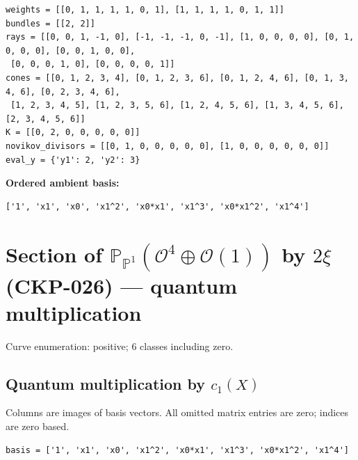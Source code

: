 \documentclass[10pt,a4paper]{article}
\begin{document}
\begin{lstlisting}
weights = [[0, 1, 1, 1, 1, 0, 1], [1, 1, 1, 1, 0, 1, 1]]
bundles = [[2, 2]]
rays = [[0, 0, 1, -1, 0], [-1, -1, -1, 0, -1], [1, 0, 0, 0, 0], [0, 1, 0, 0, 0], [0, 0, 1, 0, 0],
 [0, 0, 0, 1, 0], [0, 0, 0, 0, 1]]
cones = [[0, 1, 2, 3, 4], [0, 1, 2, 3, 6], [0, 1, 2, 4, 6], [0, 1, 3, 4, 6], [0, 2, 3, 4, 6],
 [1, 2, 3, 4, 5], [1, 2, 3, 5, 6], [1, 2, 4, 5, 6], [1, 3, 4, 5, 6], [2, 3, 4, 5, 6]]
K = [[0, 2, 0, 0, 0, 0, 0]]
novikov_divisors = [[0, 1, 0, 0, 0, 0, 0], [1, 0, 0, 0, 0, 0, 0]]
eval_y = {'y1': 2, 'y2': 3}
\end{lstlisting}

\textbf{Ordered ambient basis:}
\begin{lstlisting}
['1', 'x1', 'x0', 'x1^2', 'x0*x1', 'x1^3', 'x0*x1^2', 'x1^4']
\end{lstlisting}

\clearpage\section*{Section of $\mathbb P_{\mathbb P^{1}}(\mathcal O^{4}\oplus \mathcal O(1))$ by $2\xi $ (CKP-026) --- quantum multiplication}

Curve enumeration: positive; 6 classes including zero.
\subsection*{Quantum multiplication by $c_1(X)$}
Columns are images of basis vectors. All omitted matrix entries are zero; indices are zero based.

\begin{lstlisting}
basis = ['1', 'x1', 'x0', 'x1^2', 'x0*x1', 'x1^3', 'x0*x1^2', 'x1^4']
\end{lstlisting}
\end{document}
